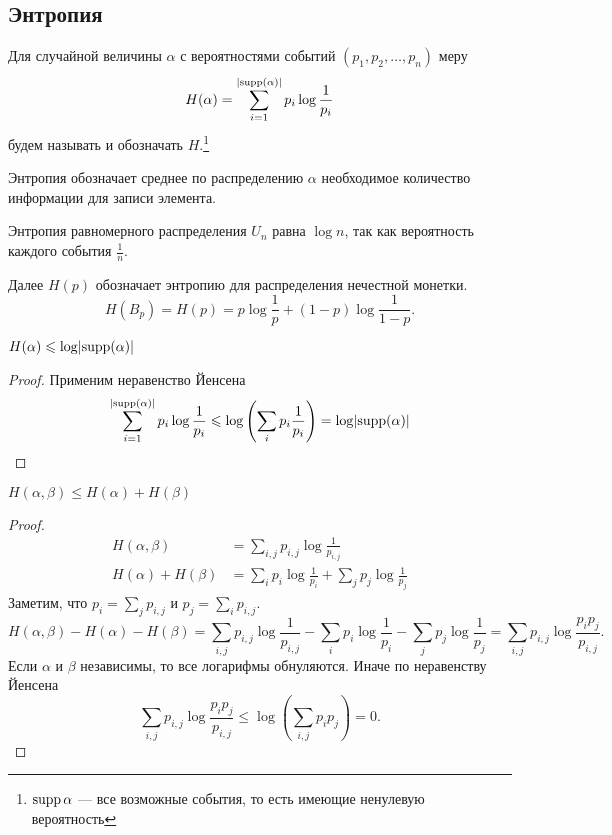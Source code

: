 \subsection{Энтропия}
\begin{defn}[Энтропия]
	Для случайной величины $  \alpha $ с вероятностями событий $ (p_1, p_2, \ldots, p_n)$ меру
\[
	H( \alpha ) = \sum_{i = 1}^{\lvert \operatorname{supp} ( \alpha ) \rvert } p_i \log \frac{1}{p_i}
\] 
	будем называть  и обозначать $ H$.\footnote{$ \operatorname{supp} \alpha $ --- все возможные события, то есть имеющие ненулевую вероятность}

Энтропия обозначает среднее по распределению $  \alpha $ необходимое количество информации для записи элемента.
\end{defn}
\begin{note}
    Энтропия равномерного распределения $U_n$ равна $ \log n$, так как вероятность каждого события $ \frac{1}{n}$.
\end{note}
\begin{note}
	Далее $ H(p) $ обозначает энтропию для распределения нечестной монетки.
	\[
		H(B_p) = H(p) = p \log \frac{1}{p} + (1-p) \log \frac{1}{1-p}
	.\] 
\end{note}

\begin{thm}
	$ H( \alpha ) \leqslant  \log \lvert \operatorname{supp} ( \alpha ) \rvert $
\end{thm}
\begin{proof}
	Применим неравенство Йенсена
	 \[
	\begin{aligned}
		\sum_{i = 1}^{\lvert \operatorname{supp} ( \alpha ) \rvert } p_i \log \frac{1}{p_i} \leqslant  \log \left( \sum_{i}^{} p_i \frac{1}{p_i} \right)  = \log \lvert \operatorname{supp} ( \alpha ) \rvert 
	\end{aligned}
	\]
\end{proof}
\begin{thm}
	$ H( \alpha , \beta ) \le H( \alpha ) + H ( \beta )$
\end{thm}
\begin{proof}
    \[
    \begin{aligned}
		H( \alpha , \beta ) &= \sum_{i, j}^{} p_{i, j} \log \frac{1}{p_{i, j}} \\
		H( \alpha ) + H( \beta ) &= \sum_{i}^{} p_i\log  \frac{1}{p_i} + \sum_{j}^{} p_j \log \frac{1}{p_j}
	\end{aligned}
	\]
	Заметим, что $ p_i = \sum\limits_{j}^{} p_{i, j}$ и $ p_j = \sum\limits_{i}^{} p_{i, j}$.
	\[
		H( \alpha , \beta ) -H( \alpha ) - H( \beta )= \sum_{i, j}^{} p_{i, j} \log \frac{1}{p_{i, j}}
		- \sum_{i}^{} p_i\log  \frac{1}{p_i} - \sum_{j}^{} p_j \log \frac{1}{p_j} = \sum_{i, j}^{ } p_{i, j} \log \frac{p_i p_j}{p_{i, j}}
	.\] 
	Если $  \alpha $ и $ \beta $ независимы, то все логарифмы обнуляются. Иначе по неравенству Йенсена
	\[
		\sum_{i, j}^{ } p_{i, j} \log \frac{p_i p_j}{p_{i, j}} \le  \log \left( \sum_{i, j}^{ } p_i p_j \right)  = 0
	.\] 
\end{proof}

